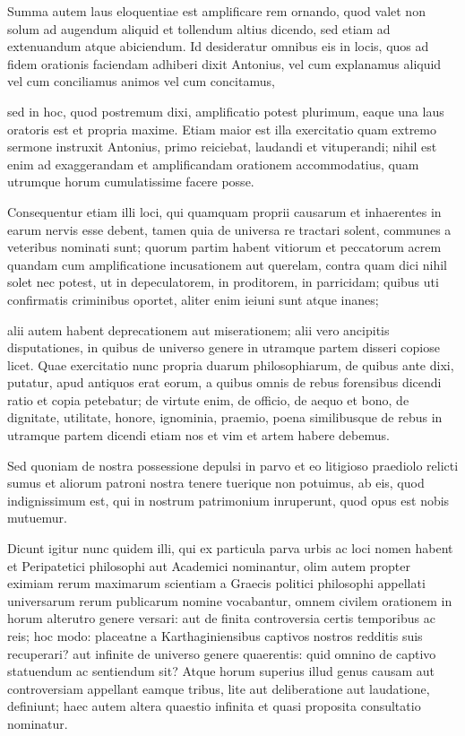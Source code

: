  Summa autem laus eloquentiae est amplificare rem ornando, quod valet non solum ad augendum aliquid et tollendum altius dicendo, sed etiam ad extenuandum atque abiciendum. Id desideratur omnibus eis in locis, quos ad fidem orationis faciendam adhiberi dixit Antonius, vel cum explanamus aliquid vel cum conciliamus animos vel cum concitamus,

 sed in hoc, quod postremum dixi, amplificatio potest plurimum, eaque una laus oratoris est et propria maxime. Etiam maior est illa exercitatio quam extremo sermone instruxit Antonius, primo reiciebat, laudandi et vituperandi; nihil est enim ad exaggerandam et amplificandam orationem accommodatius, quam utrumque horum cumulatissime facere posse.

 Consequentur etiam illi loci, qui quamquam proprii causarum et inhaerentes in earum nervis esse debent, tamen quia de universa re tractari solent, communes a veteribus nominati sunt; quorum partim habent vitiorum et peccatorum acrem quandam cum amplificatione incusationem aut querelam, contra quam dici nihil solet nec potest, ut in depeculatorem, in proditorem, in parricidam; quibus uti confirmatis criminibus oportet, aliter enim ieiuni sunt atque inanes;

 alii autem habent deprecationem aut miserationem; alii vero ancipitis disputationes, in quibus de universo genere in utramque partem disseri copiose licet. Quae exercitatio nunc propria duarum philosophiarum, de quibus ante dixi, putatur, apud antiquos erat eorum, a quibus omnis de rebus forensibus dicendi ratio et copia petebatur; de virtute enim, de officio, de aequo et bono, de dignitate, utilitate, honore, ignominia, praemio, poena similibusque de rebus in utramque partem dicendi etiam nos et vim et artem habere debemus.

 Sed quoniam de nostra possessione depulsi in parvo et eo litigioso praediolo relicti sumus et aliorum patroni nostra tenere tuerique non potuimus, ab eis, quod indignissimum est, qui in nostrum patrimonium inruperunt, quod opus est nobis mutuemur.

 Dicunt igitur nunc quidem illi, qui ex particula parva urbis ac loci nomen habent et Peripatetici philosophi aut Academici nominantur, olim autem propter eximiam rerum maximarum scientiam a Graecis politici philosophi appellati universarum rerum publicarum nomine vocabantur, omnem civilem orationem in horum alterutro genere versari: aut de finita controversia certis temporibus ac reis; hoc modo: placeatne a Karthaginiensibus captivos nostros redditis suis recuperari? aut infinite de universo genere quaerentis: quid omnino de captivo statuendum ac sentiendum sit? Atque horum superius illud genus causam aut controversiam appellant eamque tribus, lite aut deliberatione aut laudatione, definiunt; haec autem altera quaestio infinita et quasi proposita consultatio nominatur.

